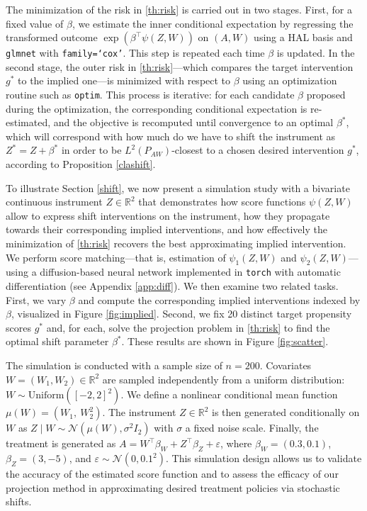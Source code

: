 \documentclass[12pt]{article}
\theoremstyle{thmstyleone}%
\theoremstyle{thmstyletwo}%
\theoremstyle{thmstylethree}%
\begin{document}
The minimization of the risk in \eqref{th:risk} is carried out in two stages. First, for a fixed value of $\beta$, we estimate the inner conditional expectation
by regressing the transformed outcome $\exp(\beta^\top \psi(Z,W))$ on $(A, W)$ using a HAL basis and \texttt{glmnet} with \texttt{family=‘cox’}. This step is repeated each time $\beta$ is updated. In the second stage, the outer risk in \eqref{th:risk}—which compares the target intervention $g^* $ to the implied one—is minimized with respect to $\beta$ using an optimization routine such as \texttt{optim}. This process is iterative: for each candidate $\beta$ proposed during the optimization, the corresponding conditional expectation is re-estimated, and the objective is recomputed until convergence to an optimal $\beta^*$, which will correspond with how much do we have to shift the instrument as $Z^* = Z + \beta^*$ in order to be $L^2(P_{AW})$-closest to a chosen desired intervention $g^*$, according to Proposition \ref{clashift}. 




To illustrate Section \ref{shift}, we now present a simulation study with a bivariate continuous instrument $Z \in \mathbb{R}^2$ that demonstrates how score functions $\psi(Z,W)$ allow to express shift interventions on the instrument, how they propagate towards their corresponding implied interventions, and how effectively the minimization of \eqref{th:risk} recovers the best approximating implied intervention. We perform score matching—that is, estimation of $\psi_1(Z,W)$ and $\psi_2(Z,W)$—using a diffusion-based neural network implemented in \texttt{torch} with automatic differentiation (see Appendix \ref{app:diff}). We then examine two related tasks. First, we vary $\beta$ and compute the corresponding implied interventions indexed by $\beta$, visualized in Figure \ref{fig:implied}. Second, we fix 20 distinct target propensity scores $g^*$ and, for each, solve the projection problem in \eqref{th:risk} to find the optimal shift parameter $\beta^*$. These results are shown in Figure \ref{fig:scatter}.

The simulation is conducted with a sample size of $n=200$. Covariates $W = (W_1, W_2) \in \mathbb{R}^2$ are sampled independently from a uniform distribution: $W \sim \text{Uniform}([-2, 2]^2)$. We define a nonlinear conditional mean function $\mu(W) = (W_1,\ W_2^2)$. The instrument $Z \in \mathbb{R}^2$ is then generated conditionally on $W$ as $Z \mid W \sim \mathcal{N}(\mu(W), \sigma^2 I_2)$
with $\sigma$ a fixed noise scale. Finally, the treatment is generated as $A = W^\top \beta_W + Z^\top \beta_Z + \varepsilon $,
where $\beta_W = (0.3, 0.1)$, $\beta_Z = (3, -5)$, and $\varepsilon \sim \mathcal{N}(0, 0.1^2)$. This simulation design allows us to validate the accuracy of the estimated score function and to assess the efficacy of our projection method in approximating desired treatment policies via stochastic shifts.
\end{document}
